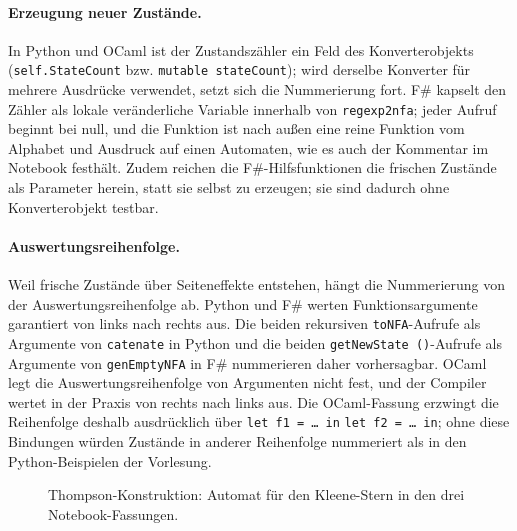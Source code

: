 \paragraph{Erzeugung neuer Zustände.}
In Python und OCaml ist der Zustandszähler ein Feld des Konverterobjekts (\texttt{self.StateCount} bzw. \texttt{mutable stateCount}); wird derselbe Konverter für mehrere Ausdrücke verwendet, setzt sich die Nummerierung fort.
F\# kapselt den Zähler als lokale veränderliche Variable innerhalb von \texttt{regexp2nfa}; jeder Aufruf beginnt bei null, und die Funktion ist nach außen eine reine Funktion vom Alphabet und Ausdruck auf einen Automaten, wie es auch der Kommentar im Notebook festhält.
Zudem reichen die F\#-Hilfsfunktionen die frischen Zustände als Parameter herein, statt sie selbst zu erzeugen; sie sind dadurch ohne Konverterobjekt testbar.

\paragraph{Auswertungsreihenfolge.}
Weil frische Zustände über Seiteneffekte entstehen, hängt die Nummerierung von der Auswertungsreihenfolge ab.
Python und F\# werten Funktionsargumente garantiert von links nach rechts aus.
Die beiden rekursiven \texttt{toNFA}-Aufrufe als Argumente von \texttt{catenate} in Python und die beiden \texttt{getNewState ()}-Aufrufe als Argumente von \texttt{genEmptyNFA} in F\# nummerieren daher vorhersagbar.
OCaml legt die Auswertungsreihenfolge von Argumenten nicht fest, und der Compiler wertet in der Praxis von rechts nach links aus.
Die OCaml-Fassung erzwingt die Reihenfolge deshalb ausdrücklich über \texttt{let f1 = \dots{} in} \texttt{let f2 = \dots{} in}; ohne diese Bindungen würden Zustände in anderer Reihenfolge nummeriert als in den Python-Beispielen der Vorlesung.

\begin{figure}[tbp]



\caption{Thompson-Konstruktion: Automat für den Kleene-Stern in den drei Notebook-Fassungen.}
\label{fig:thompson_kleene}
\end{figure}

